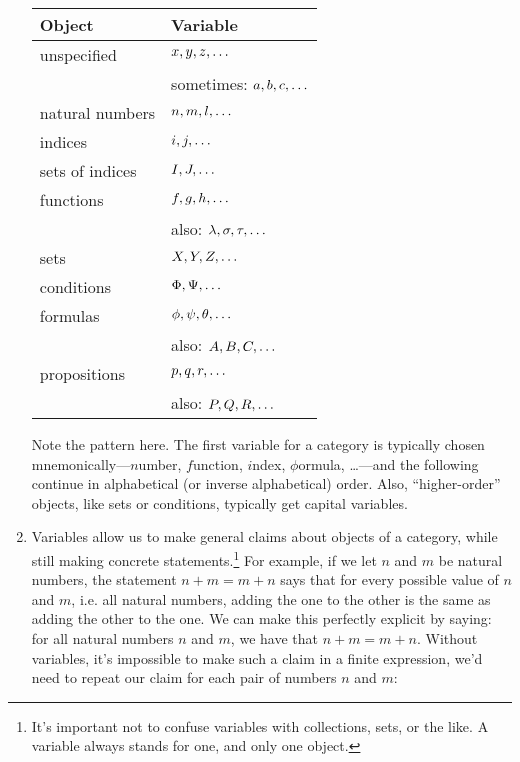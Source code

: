 \begin{enumerate}[{\thesection}.1]
		\begin{longtable}{l | l}
			Object & Variable\\\hline
			
			unspecified & $x,y,z,\mathellipsis$\\
			
					& sometimes: $a,b,c, \mathellipsis$\\
			
			natural numbers & $n,m,l,\mathellipsis$\\
			
			indices & $i,j,\mathellipsis$ \\
			
			sets of indices & $I,J,\mathellipsis$\\
			
			functions & $f,g,h,\mathellipsis$\\
			
					& also: $\lambda, \sigma,\tau,\mathellipsis$\\
			
			sets & $X,Y,Z,\mathellipsis$ \\
			
			conditions & $\Phi,\Psi,\mathellipsis$\\
			
			formulas	 & $\phi,\psi,\theta,\mathellipsis$\\
			
					& also: $A,B,C, \mathellipsis$\\
					
			propositions & $p,q,r, \mathellipsis$\\
					& also: $P,Q,R,\mathellipsis$
			
			\end{longtable}
			
	Note the pattern here. The first variable for a category is typically chosen  mnemonically---$n$umber, $f$unction, $i$ndex, $\phi$ormula, \dots---and the following continue in alphabetical (or inverse alphabetical) order. Also, ``higher-order'' objects, like sets or conditions, typically get capital variables. 
	
		\item Variables allow us to make general claims about objects of a category, while still making concrete statements.\footnote{It's important not to confuse variables with collections, sets, or the like. A variable always stands for one, and only one object.}  For example, if we let $n$ and $m$ be natural numbers, the statement $n+m=m+n$ says that for every possible value of $n$ and $m$, i.e. all natural numbers, adding the one to the other is the same as adding the other to the one. We can make this perfectly explicit by saying: for all natural numbers $n$ and $m$, we have that $n+m=m+n$. Without variables, it's impossible to make such a claim in a finite expression, we'd need to repeat our claim for each pair of numbers $n$ and $m$:
		

\end{enumerate}
